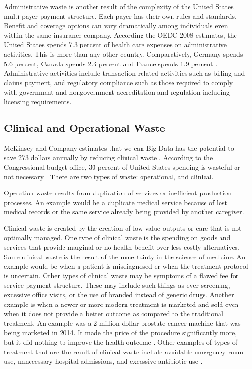 \documentclass[sigconf]{acmart}
\begin{document}
Administrative waste is another result of the complexity of the United States multi payer payment structure. Each payer has their own rules and standards. Benefit and coverage options can vary dramatically among individuals even within the same insurance company.  According the OEDC 2008 estimates, the United States spends 7.3 percent of health care expenses on administrative activities. This is more than any other country. Comparatively, Germany spends 5.6 percent, Canada spends 2.6 percent and France spends 1.9 percent \cite{OEDC}.   Administrative activities include transaction related activities such as billing and claims payment, and regulatory compliance such as those required to comply with government and nongovernment accreditation and regulation including licensing requirements.

\subsection{Clinical and Operational Waste}

McKinsey and Company estimates that we can Big Data has the potential to save 273 dollars annually by reducing clinical waste \cite{springer}. According to the Congressional budget office, 30 percent of United States spending is wasteful or not necessary \cite{consumer}. There are two types of waste:  operational, and clinical. 


Operation waste results from duplication of services or inefficient production processes.  An example would be a duplicate medical service because of lost medical records or the same service already being provided by another caregiver.


Clinical waste is created by the creation of low value outputs or care that is not optimally managed. One type of clinical waste is the spending on goods and services that provide marginal or no health benefit over less costly alternatives.  Some clinical waste is the result of the uncertainty in the science of medicine. An example would be when a patient is misdiagnosed or when the treatment protocol is uncertain. Other types of clinical waste may be symptoms of a flawed fee for service payment structure. These may include such things as over screening, excessive office visits, or the use of branded instead of generic drugs.   Another example is when a newer or more modern treatment is marketed and sold even when it does not provide a better outcome as compared to the traditional treatment. An example was a 2 million dollar prostate cancer machine that was being marketed in 2014. It made the price of the procedure significantly more, but it did nothing to improve the health outcome \cite{consumer}.  Other examples of types of treatment that are the result of clinical waste include avoidable emergency room use, unnecessary hospital admissions, and excessive antibiotic use \cite{milbank}. 
 
\end{document}

